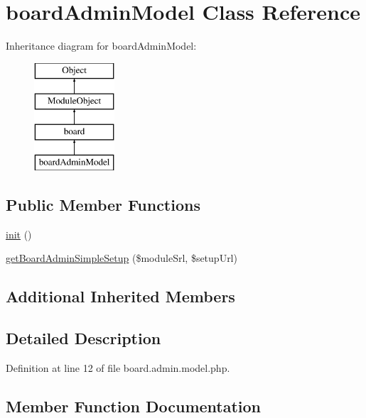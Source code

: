 \hypertarget{classboardAdminModel}{}\section{board\+Admin\+Model Class Reference}
\label{classboardAdminModel}
Inheritance diagram for board\+Admin\+Model\+:\begin{figure}[H]
\begin{center}
\leavevmode
\includegraphics[height=4.000000cm]{classboardAdminModel}
\end{center}
\end{figure}
\subsection*{Public Member Functions}
\begin{DoxyCompactItemize}
\item 
\hyperlink{classboardAdminModel_a93e03d7310fcdba8892e43de7fb532d0}{init} ()
\item 
\hyperlink{classboardAdminModel_a797f234de297b980f7fb66ab45959ad3}{get\+Board\+Admin\+Simple\+Setup} (\$module\+Srl, \$setup\+Url)
\end{DoxyCompactItemize}
\subsection*{Additional Inherited Members}


\subsection{Detailed Description}


Definition at line 12 of file board.\+admin.\+model.\+php.



\subsection{Member Function Documentation}
\hypertarget{classboardAdminModel_a797f234de297b980f7fb66ab45959ad3}{}\label{classboardAdminModel_a797f234de297b980f7fb66ab45959ad3} 
